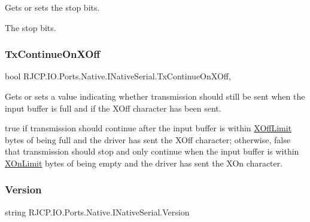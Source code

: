 Gets or sets the stop bits. 

The stop bits. \mbox{\label{interface_r_j_c_p_1_1_i_o_1_1_ports_1_1_native_1_1_i_native_serial_a1eec3e842328bb6e4bcce4e2be2d1bf0}} 
\subsubsection{\texorpdfstring{TxContinueOnXOff}{TxContinueOnXOff}}
{\footnotesize\ttfamily bool R\+J\+C\+P.\+I\+O.\+Ports.\+Native.\+I\+Native\+Serial.\+Tx\+Continue\+On\+X\+Off\hspace{0.3cm}{\ttfamily [get]}, {\ttfamily [set]}}



Gets or sets a value indicating whether transmission should still be sent when the input buffer is full and if the X\+Off character has been sent. 

{\ttfamily true} if transmission should continue after the input buffer is within \mbox{\hyperlink{interface_r_j_c_p_1_1_i_o_1_1_ports_1_1_native_1_1_i_native_serial_a5de3ace98b543f8ebe8cab894252371a}{X\+Off\+Limit}} bytes of being full and the driver has sent the X\+Off character; otherwise, {\ttfamily false} that transmission should stop and only continue when the input buffer is within \mbox{\hyperlink{interface_r_j_c_p_1_1_i_o_1_1_ports_1_1_native_1_1_i_native_serial_a8c3484cd56da718abd285e3041538385}{X\+On\+Limit}} bytes of being empty and the driver has sent the X\+On character. \mbox{\label{interface_r_j_c_p_1_1_i_o_1_1_ports_1_1_native_1_1_i_native_serial_a106c7dfa81d0a5f4c8bb3f43b80b5554}} 
\subsubsection{\texorpdfstring{Version}{Version}}
{\footnotesize\ttfamily string R\+J\+C\+P.\+I\+O.\+Ports.\+Native.\+I\+Native\+Serial.\+Version\hspace{0.3cm}{\ttfamily [get]}}



